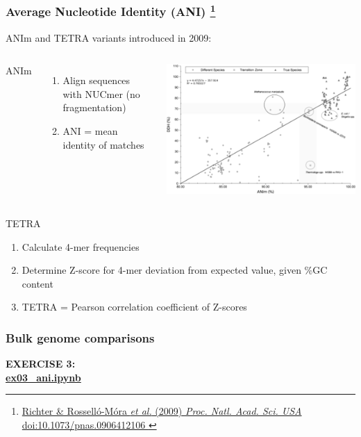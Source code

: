 %
\begin{frame}
  \frametitle{Average Nucleotide Identity (ANI)
  \footnote{\tiny{\href{http://dx.doi.org/10.1073/pnas.0906412106
}{Richter \& Rossell\'{o}-M\'{o}ra \textit{et al.} (2009) \textit{Proc. Natl. Acad. Sci. USA} doi:10.1073/pnas.0906412106
}}}
  }
  ANIm and TETRA variants introduced in 2009:
  \begin{columns}[T] 
      \textcolor{RawSienna}{ANIm}
      \begin{enumerate}
        \item \textcolor{hutton_green}{Align sequences with NUCmer (no fragmentation)}
        \item \textcolor{hutton_purple}{ANI = mean identity of matches}
      \end{enumerate}
      \includegraphics[width=\textwidth]{images/anim_ddh_equiv}
  \end{columns}    
  \textcolor{RawSienna}{TETRA}
  \begin{enumerate}
    \item \textcolor{hutton_green}{Calculate 4-mer frequencies}
    \item \textcolor{hutton_blue}{Determine Z-score for 4-mer deviation from expected value, given \%GC content}
    \item \textcolor{hutton_purple}{TETRA = Pearson correlation coefficient of Z-scores}
  \end{enumerate}
\end{frame}

%
\begin{frame}
  \frametitle{Bulk genome comparisons}
  \Large{
    \textcolor{hutton_blue}{
      \textbf{
      EXERCISE 3: \\
      \url{ex03_ani.ipynb}
      }
    }
  }
\end{frame}

